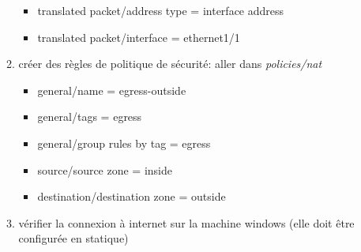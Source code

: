 \documentclass[a4paper]{article}
\begin{document}
\begin{enumerate}
\begin{enumerate}
\begin{example}
\begin{itemize}
        \item translated packet/address type = interface address
        \item translated packet/interface = ethernet1/1
    \end{itemize} \end{example}
    \item créer des règles de politique de sécurité: aller dans \textit{policies/nat}
    \begin{example} \begin{itemize}
        \item general/name = egress-outside
        \item general/tags = egress
        \item general/group rules by tag = egress
        \item source/source zone = inside
        \item destination/destination zone = outside
    \end{itemize} \end{example}
    \item vérifier la connexion à internet sur la machine windows (elle doit être configurée en statique)
\end{enumerate}



\end{enumerate}
\end{document}
